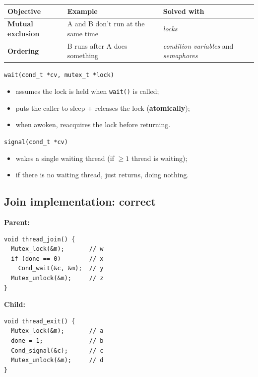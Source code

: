 \documentclass[11pt,a4paper]{article}
\begin{document}
\begin{center}
\renewcommand{\arraystretch}{1.25}
\begin{tabularx}{\textwidth}{@{}lXl@{}}
  \toprule
  \textbf{Objective} & \textbf{Example} & \textbf{Solved with} \\
  \midrule
  \textbf{Mutual exclusion} & A and B don't run at the same time & \emph{locks} \\
  \textbf{Ordering} & B runs after A does something & \emph{condition variables} and \emph{semaphores} \\
  \bottomrule
\end{tabularx}
\end{center}

\begin{defbox}
\texttt{wait(cond\_t *cv, mutex\_t *lock)}
\begin{itemize}
  \item assumes the lock is held when \texttt{wait()} is called;
  \item puts the caller to sleep + releases the lock (\textbf{atomically});
  \item when awoken, reacquires the lock before returning.
\end{itemize}
\texttt{signal(cond\_t *cv)}
\begin{itemize}
  \item wakes a single waiting thread (if \(\geq 1\) thread is waiting);
  \item if there is no waiting thread, just returns, doing nothing.
\end{itemize}
\end{defbox}

\subsection{Join implementation: correct}

\begin{center}
\begin{minipage}[t]{0.48\textwidth}
\textbf{Parent:}
\begin{lstlisting}[numbers=none]
void thread_join() {
  Mutex_lock(&m);       // w
  if (done == 0)        // x
    Cond_wait(&c, &m);  // y
  Mutex_unlock(&m);     // z
}
\end{lstlisting}
\end{minipage}\hfill
\begin{minipage}[t]{0.48\textwidth}
\textbf{Child:}
\begin{lstlisting}[numbers=none]
void thread_exit() {
  Mutex_lock(&m);       // a
  done = 1;             // b
  Cond_signal(&c);      // c
  Mutex_unlock(&m);     // d
}
\end{lstlisting}
\end{minipage}
\end{center}
\end{document}
